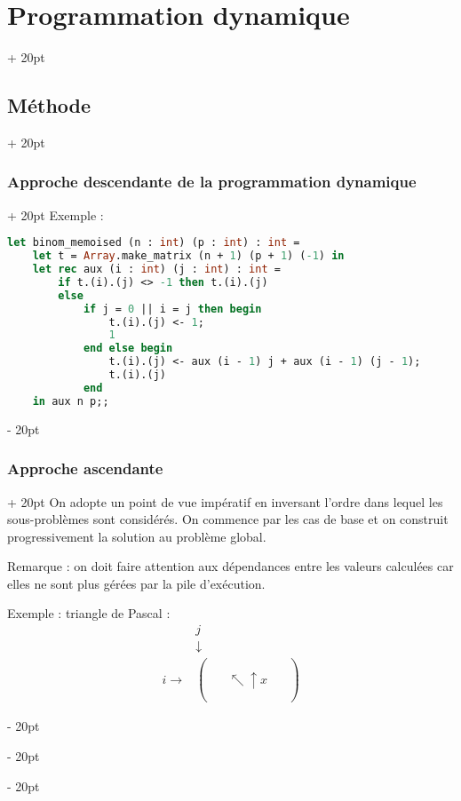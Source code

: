 \documentclass[a4paper, 12pt, twoside]{article}
\newcommand{\ind}[1][20pt]{\advance\leftskip + #1}
\newcommand{\deind}[1][20pt]{\advance\leftskip - #1}
\newenvironment{indt}[2][20pt]{#2 \par \ind[#1]}{\par \deind} %
\begin{document}
\begin{indt}{\section{Programmation dynamique}}
\begin{indt}{\subsection{Méthode}}
\begin{indt}{\subsubsection{Approche descendante de la programmation dynamique}}
                Exemple :
                
                \newpage
                
                \begin{lstlisting}[language=Caml, xleftmargin=80pt]
let binom_memoised (n : int) (p : int) : int =
    let t = Array.make_matrix (n + 1) (p + 1) (-1) in
    let rec aux (i : int) (j : int) : int =
        if t.(i).(j) <> -1 then t.(i).(j)
        else
            if j = 0 || i = j then begin
                t.(i).(j) <- 1;
                1
            end else begin
                t.(i).(j) <- aux (i - 1) j + aux (i - 1) (j - 1);
                t.(i).(j)
            end
    in aux n p;;\end{lstlisting}
            \end{indt}
            
            \vspace{12pt}
            
            \begin{indt}{\subsubsection{Approche ascendante}}
                On adopte un point de vue impératif en inversant l'ordre dans lequel les sous-problèmes sont considérés. On commence par les cas de base et on construit progressivement la solution au problème global.
                
                \vspace{12pt}
                
                Remarque : on doit faire attention aux dépendances entre les valeurs calculées car elles ne sont plus gérées par la pile d'exécution.
                
                Exemple : triangle de Pascal :
                    \[
                        \begin{array}{cc}
                            & j
                            \\
                            & \downarrow
                            \\
                            i \rightarrow
                            &
                            \begin{pmatrix} 
                                \phantom a & \phantom a & \phantom a
                                \\
                                \phantom a & \nwarrow \!\! \uparrow \!\!\!\!\!\! x & \phantom a
                                \\
                                \phantom a & \phantom a & \phantom a
                            \end{pmatrix}
                        \end{array}
                    \]
                

\end{indt}
\end{indt}
\end{indt}
\end{document}
